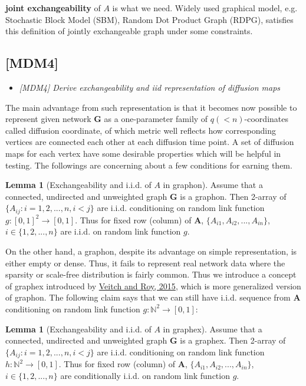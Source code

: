 \documentclass[12pt]{article}
\theoremstyle{definition}
\newtheorem{lemma}[theorem]{Lemma}
\begin{document}
\textbf{joint exchangeability} of $A$ is what we need. 
Widely used graphical model, e.g. Stochastic Block Model (SBM), Random Dot Product Graph (RDPG), satisfies this definition of jointly exchangeable graph under some constraints. 


\subsection{[MDM4]}
\begin{itemize}
	\item {\it  [MDM4] Derive exchangeability and iid representation of diffusion maps \/}
\end{itemize}


The main advantage from such representation is that it becomes now possible to represent given network $\boldsymbol{G}$ as a one-parameter family of $q(<n)$-coordinates called diffusion coordinate, of which metric well reflects how corresponding vertices are connected each other at each diffusion time point. A set of diffusion maps for each vertex have some desirable properties which will be helpful in testing. The followings are concerning about a few conditions for earning them. 

\begin{lemma}[Exchangeability and i.i.d. of $A$ in graphon]
	\label{lemma1}
Assume that a connected, undirected and unweighted graph $\mathbf{G}$ is a graphon. Then 2-array of $\{ A_{ij} : i = 1,2,... ,n , i < j \}$ are i.i.d. conditioning on random link function $g : [0,1]^2 \rightarrow [0,1]$. Thus for fixed row (column) of $\mathbf{A}$, $\{ A_{i1}, A_{i2}, ... , A_{in} \}$, $i \in \{ 1,2,... , n \}$ are i.i.d. on random link function $g$.  
\end{lemma}

On the other hand, a graphon, despite its advantage on simple representation, is either empty or dense. Thus, it fails to represent real network data where the sparsity or scale-free distribution is fairly common. Thus we introduce a concept of graphex introduced by \href{http://arxiv.org/abs/1512.03099}{Veitch and Roy, 2015}, which is more generalized version of graphon. The following claim says that we can still have i.i.d. sequence from $\mathbf{A}$ conditioning on random link function $g : \mathbb{N}^2 \rightarrow [0,1]$:

\begin{lemma}[Exchangeability and i.i.d. of $A$ in graphex]
	\label{lemma2}
Assume that a connected, undirected and unweighted graph $\mathbf{G}$ is a graphex. Then 2-array of $\{ A_{ij} : i = 1,2,... ,n , i < j \}$ are i.i.d. conditioning on random link function $h : \mathbb{N}^2 \rightarrow [0,1]$. Thus for fixed row (column) of $\mathbf{A}$, $\{ A_{i1}, A_{i2}, ... , A_{in} \}$, $i \in \{ 1,2,... , n \}$ are conditionally i.i.d. on random link function $g$.   
\end{lemma}
\end{document}
